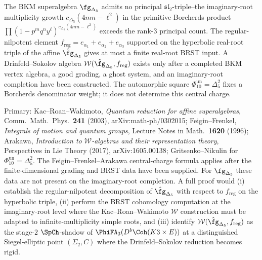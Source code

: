 \begin{conjecture}
\label{conj:k3y-ds-reduction-c-214-programme}
\ClaimStatusConjectured
The BKM superalgebra $\fg_{\Delta_5}$ admits no principal
$\mathfrak{sl}_2$-triple--the imaginary-root multiplicity growth
$c_{\Delta_5}(4mn-\ell^2)$ in the primitive Borcherds product
$\prod(1-p^m q^n y^\ell)^{c_{\Delta_5}(4mn-\ell^2)}$ exceeds the
rank-$3$ principal count. The regular-nilpotent element
$f_{\mathrm{reg}} = e_{\alpha_1} + e_{\alpha_2} + e_{\alpha_3}$
supported on the hyperbolic real-root triple of the affine
$\hat\fg_{\Delta_5}$ gives at most a finite real-root BRST input. A
Drinfeld--Sokolov algebra
\(\mathcal W(\hat\fg_{\Delta_5},f_{\mathrm{reg}})\) exists only after a
completed BKM vertex algebra, a good grading, a ghost system, and an
imaginary-root completion have been constructed. The automorphic square
\(\Phi_{10}^{\mathrm{un}}=\Delta_5^2\) fixes a Borcherds denominator
weight; it does not determine this central charge.
\end{conjecture}

Primary: Kac--Roan--Wakimoto, \emph{Quantum reduction for affine
superalgebras}, Comm.\ Math.\ Phys.\ \textbf{241} (2003),
arXiv:math-ph/0302015; Feigin--Frenkel, \emph{Integrals of motion and
quantum groups}, Lecture Notes in Math.\ \textbf{1620} (1996);
Arakawa, \emph{Introduction to $\mathcal W$-algebras and their
representation theory}, Perspectives in Lie Theory (2017),
arXiv:1605.00138; Gritsenko--Nikulin
\cite{GritsenkoNikulin1997,GritsenkoNikulin1998} for
\(\Phi_{10}^{\mathrm{un}}=\Delta_5^2\). The Feigin--Frenkel--Arakawa
central-charge formula applies after the finite-dimensional grading and
BRST data have been supplied. For \(\fg_{\Delta_5}\) these data are not
present on the imaginary-root completion. A full proof would
(i) establish the regular-nilpotent decomposition of
$\hat\fg_{\Delta_5}$ with respect to $f_{\mathrm{reg}}$ on the
hyperbolic triple, (ii) perform the BRST cohomology computation at
the imaginary-root level where the Kac--Roan--Wakimoto $\mathcal W$
construction must be adapted to infinite-multiplicity simple roots,
and (iii) identify
$\mathcal W(\hat\fg_{\Delta_5}, f_{\mathrm{reg}})$ as the stage-$2$
$\SpCh$-shadow of $\PhiFA_3(D^b\Coh(K3\times E))$ at a distinguished
Siegel-elliptic point $(\Sigma_2, C)$ where the Drinfeld--Sokolov
reduction becomes rigid.

